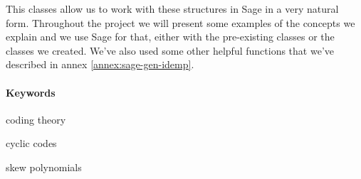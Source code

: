 This classes allow us to work with these structures in Sage in a very natural form.
Throughout the project we will present some examples of the concepts we explain and we use Sage for that, either with the pre-existing classes or the classes we created.
We've also used some other helpful functions that we've described in annex \ref{annex:sage-gen-idemp}.

\paragraph{Keywords}
\begin{itemize*}[label=,itemsep=4em,itemjoin=\hspace{2em}]
  \item coding theory
  \item cyclic codes 
  \item skew polynomials
\end{itemize*}